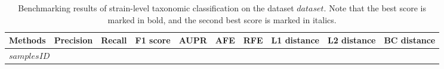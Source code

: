 
\begin{table}[ht]
\renewcommand\arraystretch{1.}
    \centering
    \small
    \setlength\tabcolsep{2pt} 
    \begin{tabular}{p{} p{1.5cm}<{\centering} p{1.5cm}<{\centering} p{1.5cm}<{\centering} p{1.5cm}<{\centering} p{}<{\centering} p{}<{\centering} p{1.5cm}<{\centering} p{1.5cm}<{\centering} p{1.5cm}<{\centering}}

    \toprule
    Methods & Precision & Recall & F1 score & AUPR & AFE & RFE & L1 distance & L2 distance & BC distance \\ 
    \midrule
    \multicolumn{4}{l}{$samplesID$} \\
    \hline     
\bottomrule
    \end{tabular}
    \vspace{1mm}
    \caption{Benchmarking results of strain-level taxonomic classification on the dataset $dataset$. Note that the best score is marked in bold, and the second best score is marked in italics.}
    \label{tab:res_strain_$dataset$}
\end{table}
